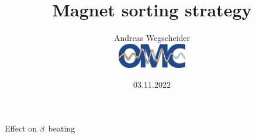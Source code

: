 \documentclass[usenames,dvipsnames,aspectratio=169,table]{beamer}
\author[awegsche]{%
Andreas Wegscheider\\[1em]
\centering%
\includegraphics[width=3cm]{OMC_logo_original.pdf}%
}
\title[Magnet sorting]{Magnet sorting strategy}
\institute{CERN}
\date[03.11.22]{03.11.2022}
\begin{document}
\begin{frame}
    \titlepage
\end{frame}





\begin{frame} %
    {Effect on $\beta$~beating}




\end{frame} %


\end{document}
